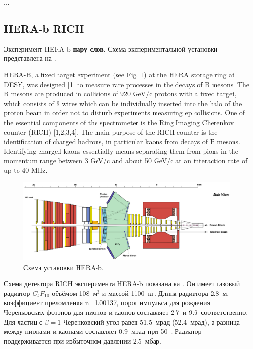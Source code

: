 ...

\subsection{HERA-b RICH}\label{sec:HerabRich}


Эксперимент HERA-b \todo \textbf{пару слов}. Схема экспериментальной установки представлена на .

HERA-B, a fixed target experiment (see Fig. 1) at the HERA storage ring at DESY, was designed [1] to measure rare processes in the decays of B mesons. The B mesons are produced in collisions of 920 GeV/c protons with a fixed target, which consists of 8 wires which can be individually inserted into the halo of the proton beam in order not to disturb experiments measuring ep collisions. One of the essential components of the spectrometer is the Ring Imaging Cherenkov counter (RICH) [1,2,3,4]. The main purpose of the RICH counter is the identification of charged hadrons, in particular kaons from decays of B mesons. Identifying charged kaons essentially means separating them from pions in the momentum range between 3 GeV/c and about 50 GeV/c at an interaction rate of up to 40 MHz.

\begin{figure}[H]
\centering
\includegraphics[width=1.0\textwidth]{pictures/HERA_b_setup.png}
\caption{Схема установки HERA-b.}
\label{fig:HERAbSetup}
\end{figure}

Схема детектора RICH эксперимента HERA-b показана на . Он имеет газовый радиатор $C_{4}F_{10}$ объёмом 108~м$^3$ и массой 1100~кг. Длина радиатора 2.8~м, коэффициент преломления n=1.00137, порог импульса для рождения Черенковских фотонов для пионов и каонов составляет 2.7~\GeVoverC и 9.6~\GeVoverC соответственно. Для частиц с $\beta=1$ Черенковский угол равен 51.5~мрад (52.4~мрад), а разница между пионами и каонами составляет 0.9~мрад при 50~\GeVoverC. Радиатор поддерживается при избыточном давлении 2.5~мбар.

